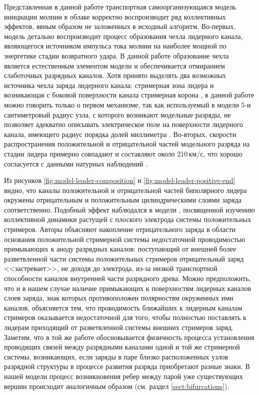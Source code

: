 Представленная в данной работе транспортная самоорганизующаяся модель инициации молнии в облаке корректно воспроизводит ряд коллективных эффектов, явным образом не заложенных в исходный алгоритм. Во-первых, модель детально воспроизводит процесс образования чехла лидерного канала, являющегося источником импульса тока молнии на наиболее мощной по энергетике стадии возвратного удара. В данной работе образование чехла является естественным элементом модели и обеспечивается отмиранием слаботочных разрядных каналов. Хотя принято выделять два возможных источника чехла заряда лидерного канала: стримерная зона лидера и возникающая с боковой поверхности канала стримерная корона \cite{Maslowski2006}, в данной работе можно говорить только о первом механизме, так как используемый в модели 5-и сантиметровый радиус узла, с которого возникают модельные разряды, не позволяет адекватно описывать электрическое поле на поверхности лидерного канала, имеющего радиус порядка долей миллиметра \cite{BazelyanRaizer-FizikaMolniiIMolniezaschity}. Во-вторых, скорости распространения положительной и отрицательной частей модельного разряда на стадии лидера примерно совпадают и составляют около 210\,км/с, что хорошо согласуется с данными натурных наблюдений \cite{VanderVelde2013}. 

Из рисунков \ref{fig:model-leader-composition} и \ref{fig:model-leader-positive-end} видно, что каналы положительной и отрицательной частей биполярного лидера окружены отрицательным и положительным цилиндрическими слоями заряда соответственно. Подобный эффект наблюдался в модели \cite{Luque2014}, посвященной изучению коллективной динамики растущей с плоского электрода системы положительных стримеров. Авторы объясняют накопление отрицательного заряда в области основания положительной стримерной системы недостаточной проводимостью примыкающих к аноду разрядных каналов: поступающий от внешней более разветвленной части системы положительных стримеров отрицательный заряд <<застревает>>, не доходя до электрода, из-за низкой транспортной способности каналов внутренней части разрядного древа. Можно предположить, что и в нашем случае наличие примыкающих к поверхностям лидерных каналов слоев заряда, знак которых противоположен полярностям окруженных ими каналов, объясняется тем, что проводимость ближайших к лидерным каналам стримеров оказывается недостаточной для того, чтобы полностью поставлять к лидерам приходящий от разветвленной системы внешних стримеров заряд. Заметим, что в той же работе обосновывается физичность процесса установления проводящих связей между разрядными каналами одной и той же стримерной системы, возникающих, если заряды в паре близко расположенных узлов разрядной структуры в процессе развития разряда приобретают разные знаки. В нашей модели процесс возникновения ребер между парой уже существующих вершин происходит аналогичным образом (см. раздел \ref{sect:bifurcations}).

